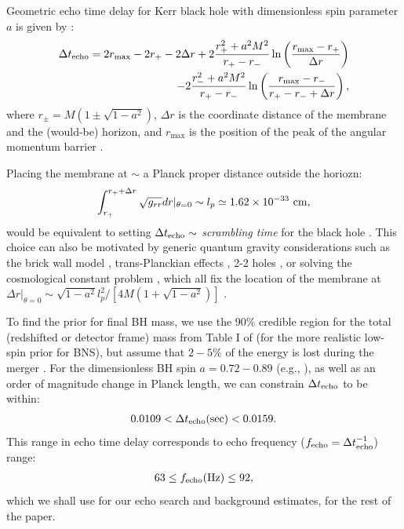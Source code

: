 \documentclass[12pt]{article}
\newcommand{\be}{\begin{equation}}
\newcommand{\ee}{\end{equation}}
\begin{document}
Geometric echo time delay for Kerr black hole with dimensionless spin parameter $a$ is given by \cite{Abedi:2016hgu}:
\begin{eqnarray}
\Delta t_{\rm echo}
=2r_{\rm max}-2r_{+}-2\Delta r 
+ 2\frac{r_{+}^{2}+a^{2}M^2}{r_{+}-r_{-}} \ln\left(\frac{r_{\rm max}-r_{+}}{\Delta r}\right) \nonumber \\
\ \ \ \ \ \ \ \ \ \ \ \ \ \ - 2\frac{r_{-}^{2}+a^{2}M^2}{r_{+}-r_{-}} \ln\left(\frac{r_{\rm max}-r_{-}}{r_{+}-r_{-}+\Delta r}\right),
\end{eqnarray}
where $r_{\pm}=M(1\pm \sqrt{1-a^{2}})$,  $\Delta r$ is the coordinate distance of the membrane and the (would-be) horizon, and $r_{\max}$ is the position of the peak of the angular momentum barrier   \cite{Abedi:2016hgu}. 

Placing the membrane at $\sim$ a Planck proper distance outside the horiozn: 
\be
\int_{r_{+}}^{r_{+}+\Delta r} \sqrt{g_{rr}} dr |_{\theta=0} \sim l_p \simeq 1.62 \times 10^{-33}~ {\rm cm},
\ee
 would be equivalent to setting $\Delta t_{\rm echo} \sim$ {\it scrambling time} for the black hole \cite{Hayden:2007cs,Sekino:2008he,Harlow:2014yka,Harlow:2013tf}. This choice can also be motivated by generic quantum gravity considerations such as the brick wall model \cite{THOOFT1985727},  trans-Planckian effects \cite{Khriplovich,York:1983zb}, 2-2 holes \cite{Holdom:2016nek}, or solving the cosmological constant problem \cite{PrescodWeinstein:2009mp}, which all fix the location of the membrane at $\Delta r|_{\theta=0} \sim{\sqrt{1-a^{2}} l_{p}^{2}}/{[4M(1+\sqrt{1-a^{2}})]}$ \cite{Abedi:2016hgu}. 


To find the prior for final BH mass, we use the  90\% credible region for the total (redshifted or detector frame) mass from Table I of \cite{TheLIGOScientific:2017qsa} (for the more realistic low-spin prior for BNS), but assume that $2-5\%$ of the energy is lost during the merger \cite{Zappa:2017xba}.  For the dimensionless BH spin $a=0.72-0.89$ (e.g., \cite{Kastaun:2013mv}), as well as an order of magnitude change in Planck length, we can constrain $\Delta t_{\rm echo}$ to be within:
\begin{eqnarray}
0.0109<\Delta t_{{\rm echo}}({\rm sec})<0.0159.
 \end{eqnarray}
This range in echo time delay corresponds to echo frequency ($f_{\rm echo} = \Delta t_{\rm echo}^{-1}$) range:
\begin{eqnarray}
63 \leq f_{{\rm echo} }({\rm Hz}) \leq 92, \label{f_prior}
 \end{eqnarray}
which we shall use for our echo search and background estimates, for the rest of the paper.
\end{document}

